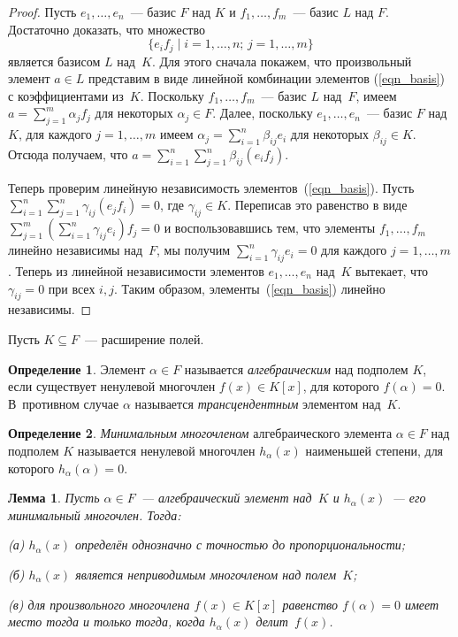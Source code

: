 \documentclass[a4paper,10pt]{amsart}
\newtheorem{lemma}{Лемма}
\theoremstyle{definition}
\newtheorem{definition}{Определение}
\theoremstyle{remark}
\begin{document}
\begin{proof}
	Пусть $e_1,\ldots,e_n$~--- базис $F$ над $K$ и $f_1,\ldots,f_m$~---
	базис $L$ над $F$. Достаточно доказать, что множество
	\begin{equation} \label{eqn_basis}
	\lbrace e_i f_j \mid i = 1,\ldots,n;\, j = 1,\ldots, m \rbrace
	\end{equation}
	является базисом $L$ над~$K$. Для этого сначала покажем, что
	произвольный элемент $a\in L$ представим в виде линейной комбинации
	элементов (\ref{eqn_basis}) с коэффициентами из~$K$. Поскольку $f_1,
	\ldots, f_m$~--- базис $L$ над~$F$, имеем $a = \sum \limits_{j=1}^m
	\alpha_j f_j$ для некоторых $\alpha_j \in F$. Далее, поскольку $e_1,
	\ldots, e_n$~--- базис $F$ над~$K$, для каждого $j = 1, \ldots, m$
	имеем $\alpha_j = \sum \limits_{i = 1}^n \beta_{ij} e_i$ для
	некоторых $\beta_{ij}\in K$. Отсюда получаем, что $a = \sum
	\limits_{i=1}^n \sum \limits_{j=1}^n \beta_{ij} (e_if_j)$.
	
	Теперь проверим линейную независимость элементов~(\ref{eqn_basis}).
	Пусть $\sum \limits_{i=1}^n \sum \limits_{j=1}^n \gamma_{ij}
	(e_jf_i) = 0$, где $\gamma_{ij} \in K$. Переписав это равенство в
	виде $\sum \limits_{j=1}^m (\sum \limits_{i=1}^n \gamma_{ij}e_i)f_j
	= 0$ и воспользовавшись тем, что элементы $f_1, \ldots, f_m$ линейно
	независимы над~$F$, мы получим $\sum \limits_{i=1}^n \gamma_{ij}e_i
	= 0$ для каждого $j = 1, \ldots, m$. Теперь из линейной
	независимости элементов $e_1, \ldots, e_n$ над~$K$ вытекает, что
	$\gamma_{ij} = 0$ при всех $i,j$. Таким образом,
	элементы~(\ref{eqn_basis}) линейно независимы.
\end{proof}

Пусть $K\subseteq F$~--- расширение полей.

\begin{definition}
	Элемент $\alpha \in F$ называется {\it алгебраическим} над подполем
	$K$, если существует ненулевой многочлен $f(x)\in K[x]$, для
	которого $f(\alpha) = 0$. В~противном случае $\alpha$ называется
	{\it трансцендентным} элементом над~$K$.
\end{definition}

\begin{definition}
	{\it Минимальным многочленом} алгебраического элемента $\alpha \in
	F$ над подполем $K$ называется ненулевой многочлен $h_\alpha(x)$
	наименьшей степени, для которого $h_\alpha(\alpha) = 0$.
\end{definition}

\begin{lemma} \label{lemma_min_pol}
	Пусть $\alpha \in F$~--- алгебраический элемент над~$K$ и
	$h_\alpha(x)$~--- его минимальный многочлен. Тогда:
	
	\textup{(а)} $h_\alpha(x)$ определён однозначно с точностью до
	пропорциональности;
	
	\textup{(б)} $h_\alpha(x)$ является неприводимым многочленом над
	полем~$K$;
	
	\textup{(в)} для произвольного многочлена $f(x)\in K[x]$ равенство
	$f(\alpha)=0$ имеет место тогда и только тогда, когда $h_\alpha(x)$
	делит~$f(x)$.
\end{lemma}
\end{document}
